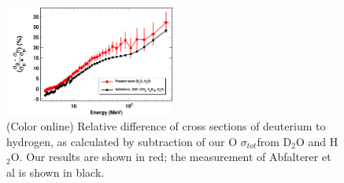 \documentclass[twocolumn,secnumarabic,amssymb, nobibnotes, aps, prl,
superscriptaddress, nobalancelastpage]{revtex4}
\newcommand{\tot}{\ensuremath{\sigma_{tot}}}
\begin{document}
\begin{figure}
    \includegraphics[width=0.5\textwidth]{figures/relativeDiff_DtoH.png}
    \caption{(Color online) Relative difference of cross sections of
        deuterium to hydrogen, as calculated by subtraction of our O \tot from
        D$_{2}$O and H$_{2}$O. Our results are shown in red; the measurement of
        Abfalterer et al \cite{Abfalterer1998} is shown in black.}
    \label{DtoH}
\end{figure}
\end{document}
